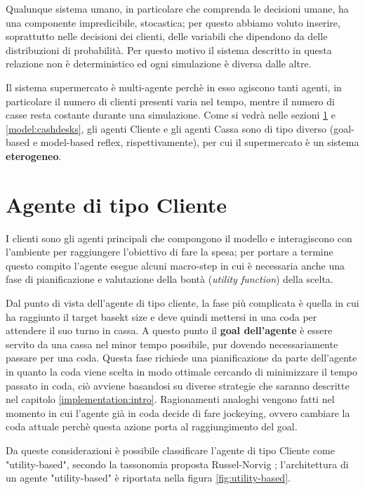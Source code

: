 Qualunque sistema umano, in particolare che comprenda le decisioni umane, ha una componente impredicibile, stocastica; per questo abbiamo voluto inserire, soprattutto nelle decisioni dei clienti, delle variabili che dipendono da delle distribuzioni di probabilità. Per questo motivo il sistema descritto in questa relazione non è deterministico ed ogni simulazione è diversa dalle altre.

Il sistema supermercato è multi-agente perchè in esso agiscono tanti agenti, in particolare il numero di clienti presenti varia nel tempo, mentre il numero di casse resta costante durante una simulazione. Come si vedrà nelle sezioni \ref{model:customers} e \ref{model:cashdesks}, gli agenti Cliente e gli agenti Cassa sono di tipo diverso (goal-based e model-based reflex, rispettivamente), per cui il supermercato è un sistema \textbf{eterogeneo}.

\section{Agente di tipo Cliente}
\label{model:customers}
I clienti sono gli agenti principali che compongono il modello e interagiscono con l'ambiente per raggiungere l'obiettivo di fare la spesa; per portare a termine questo compito l'agente esegue alcuni macro-step in cui è necessaria anche una fase di pianificazione e valutazione della bontà (\textit{utility function}) della scelta.

Dal punto di vista dell'agente di tipo cliente, la fase più complicata è quella in cui ha raggiunto il target basekt size e deve quindi mettersi in una coda per attendere il suo turno in cassa.
A questo punto il \textbf{goal dell'agente }è essere servito da una cassa nel minor tempo possibile, pur dovendo necessariamente passare per una coda.
Questa fase richiede una pianificazione da parte dell'agente in quanto la coda viene scelta in modo ottimale cercando di minimizzare il tempo passato in coda, ciò avviene basandosi su diverse strategie che saranno descritte nel capitolo \ref{implementation:intro}. Ragionamenti analoghi vengono fatti nel momento in cui l'agente già in coda decide di fare jockeying, ovvero cambiare la coda attuale perchè questa azione porta al raggiungimento del goal.

Da queste considerazioni è possibile classificare l'agente di tipo Cliente come "utility-based", secondo la tassonomia proposta Russel-Norvig \cite{norvig}; l'architettura di un agente "utility-based" è riportata nella figura \ref{fig:utility-based}.

